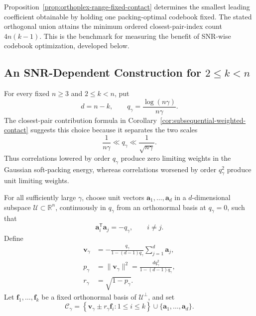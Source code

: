 \documentclass[12pt,draftclsnofoot,onecolumn]{IEEEtran}
\newcommand{\R}{\mathbb{R}}
\newcommand{\cC}{\mathcal{C}}
\newcommand{\bv}{\bm v}
\newcommand{\ba}{\bm a}
\newcommand{\T}{\mathsf T}
\theoremstyle{definition}
\begin{document}
Proposition~\ref{prop:orthoplex-range-fixed-contact} determines the
smallest leading coefficient obtainable by holding one packing-optimal
codebook fixed.  The stated orthogonal union attains the minimum ordered
closest-pair-index count \(4n(k-1)\).  This is the benchmark for measuring the
benefit of SNR-wise codebook optimization, developed below.

 
 

\subsection{An SNR-Dependent Construction for
\texorpdfstring{\(2\leq k<n\)}{2 <= k < n}}
\label{subsec:orthoplex-range-upper-bound}

For every fixed \(n\ge3\) and \(2\leq k<n\), put
\begin{equation}
  d=n-k,
  \qquad
  q_\gamma=\frac{\log(n\gamma)}{n\gamma}.
  \label{eq:orthoplex-range-moving-parameters}
\end{equation}
The closest-pair contribution formula in
Corollary~\ref{cor:subsequential-weighted-contact} suggests this choice
because it separates the two scales
\[
  \frac{1}{n\gamma}\ll q_\gamma
  \ll\frac{1}{\sqrt{n\gamma}}.
\]
Thus correlations lowered by order \(q_\gamma\) produce zero limiting
weights in the Gaussian soft-packing energy, whereas correlations worsened
by order \(q_\gamma^2\) produce unit limiting weights.

For all sufficiently large \(\gamma\), choose unit vectors
\(\ba_1,\ldots,\ba_d\) in a \(d\)-dimensional subspace
\(\mathcal U\subset\R^n\), continuously in \(q_\gamma\) from an
orthonormal basis at \(q_\gamma=0\), such that
\begin{equation}
  \ba_i^\T\ba_j=-q_\gamma,
  \qquad i\ne j.
  \label{eq:orthoplex-range-auxiliary-gram}
\end{equation}
Define
\begin{equation}
\begin{aligned}
  \bv_\gamma
  &=-\frac{q_\gamma}{1-(d-1)q_\gamma}
  \sum_{j=1}^d\ba_j,\\
  p_\gamma
  &=\|\bv_\gamma\|^2
  =\frac{dq_\gamma^2}{1-(d-1)q_\gamma},\\
  r_\gamma
  &=\sqrt{1-p_\gamma}.
\end{aligned}
  \label{eq:orthoplex-range-displacement}
\end{equation}
Let \(\bm f_1,\ldots,\bm f_k\) be a fixed orthonormal basis of
\(\mathcal U^\perp\), and set
\begin{equation}
  \cC_\gamma
  =
  \left\{
  \bv_\gamma\mathbin{\pm}r_\gamma\bm f_i:
  1\leq i\leq k
  \right\}
  \mathbin{\cup}
  \{\ba_1,\ldots,\ba_d\}.
  \label{eq:orthoplex-range-moving-codebook}
\end{equation}
\end{document}
